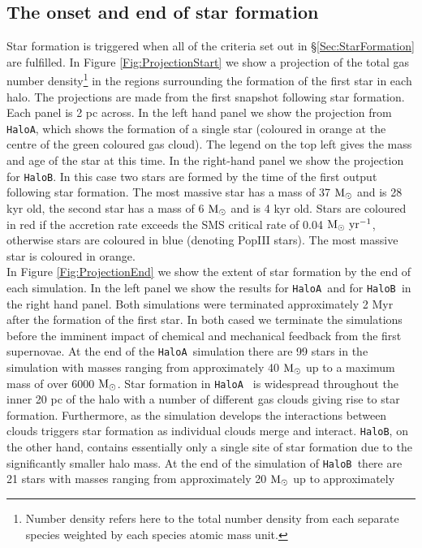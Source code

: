 \documentclass[twocolumn,iop,revtex4]{openjournal}
\newcommand{\msolar} {$\rm{M_{\odot}}~$}
\newcommand{\msolarc} {$\rm{M_{\odot}}$}
\newcommand{\msolaryrc} {$\rm{M_{\odot}~yr^{-1}}$}
\newcommand{\ha} {\texttt{HaloA~}}
\newcommand{\hb} {\texttt{HaloB~}}
\newcommand{\hac} {\texttt{HaloA}}
\newcommand{\hbc} {\texttt{HaloB}}
\begin{document}
\subsection{The onset and end of star formation}
Star formation is triggered when all of the criteria set out in \S \ref{Sec:StarFormation} are
fulfilled. In Figure \ref{Fig:ProjectionStart} we show a projection of the total gas number
density\footnote{Number density refers here to the total number density from each separate
  species weighted by each species atomic mass unit.} in the
regions surrounding the formation of the first star in each halo. The projections are made from the
first snapshot following star formation. Each panel is 2 pc across. In the left hand panel we
show the projection from \hac, which shows the formation of a single star (coloured in orange
at the centre of the green coloured gas cloud). The legend on the top left gives the mass and
age of the star at this time.
In the right-hand panel we show the projection for \hbc. In this case two stars are formed by
the time of the first
output following star formation. The most massive star has a mass of 37 \msolar and is 28 kyr old,
the second star has a mass of 6 \msolar and is 4 kyr old. Stars are coloured in red if the
accretion rate exceeds the SMS critical rate of 0.04 \msolaryrc, otherwise 
stars are coloured in blue (denoting PopIII stars). The most massive star is
coloured in orange. \\
\indent In Figure \ref{Fig:ProjectionEnd} we show the extent of star formation by the end of each
simulation. In the left panel we show the results for \ha and
for \hb in the right hand panel. Both simulations were terminated approximately 2 Myr 
after the formation of the first star. In both cased we terminate the simulations
before the imminent impact of chemical and mechanical feedback from the first supernovae.
At the end of the \ha simulation there are 99 stars in the simulation with masses ranging from
approximately 40 \msolar up to a maximum mass of over 6000 \msolarc.  Star formation in \ha
is widespread throughout the inner 20 pc of the halo with a number of different gas clouds
giving rise to star formation.
Furthermore, as the simulation develops the interactions between clouds triggers star formation as
individual clouds merge and interact. \hbc, on the other hand, contains essentially only a single
site of star formation due to the significantly smaller halo mass. At the end of the simulation of
\hb there are 21 stars with masses ranging from approximately 20 \msolar up to approximately
\end{document}

